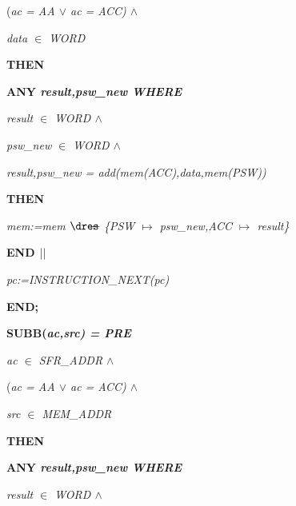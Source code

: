 \begin{sloppypar}
\hspace*{0.20in}\rm (\it ac \rm = \it AA  $\lor$  \it ac \rm = \it ACC\rm )  $\land$ 

\hspace*{0.20in}\it data $\in$  \it WORD

\hspace*{0.10in}\bf THEN

\hspace*{0.20in}\bf ANY \it result\rm ,\it psw\_new \bf WHERE

\hspace*{0.30in}\it result $\in$  \it WORD  $\land$ 

\hspace*{0.30in}\it psw\_new $\in$  \it WORD  $\land$ 

\hspace*{0.30in}\it result\rm ,\it psw\_new \rm = \it add\rm (\it mem\rm (\it ACC\rm )\rm ,\it data\rm ,\it mem\rm (\it PSW\rm )\rm )

\hspace*{0.20in}\bf THEN

\hspace*{0.30in}\it mem\rm :=\it mem $\lover$ \rm \{\it PSW $\mapsto$ \it psw\_new\rm ,\it ACC $\mapsto$ \it result\rm \}

\hspace*{0.20in}\bf END  $\mbox{$\mid\mid$}$ 

\hspace*{0.20in}\it pc\rm :=\it INSTRUCTION\_NEXT\rm (\it pc\rm )

\hspace*{0.10in}\bf END\rm ;

\hspace*{0.10in}\bf SUBB\rm (\it ac\rm ,\it src\rm ) \rm = \bf PRE

\hspace*{0.20in}\it ac $\in$  \it SFR\_ADDR  $\land$ 

\hspace*{0.20in}\rm (\it ac \rm = \it AA  $\lor$  \it ac \rm = \it ACC\rm )  $\land$ 

\hspace*{0.20in}\it src $\in$  \it MEM\_ADDR

\hspace*{0.10in}\bf THEN

\hspace*{0.20in}\bf ANY \it result\rm ,\it psw\_new \bf WHERE

\hspace*{0.30in}\it result $\in$  \it WORD  $\land$ 


\end{sloppypar}
